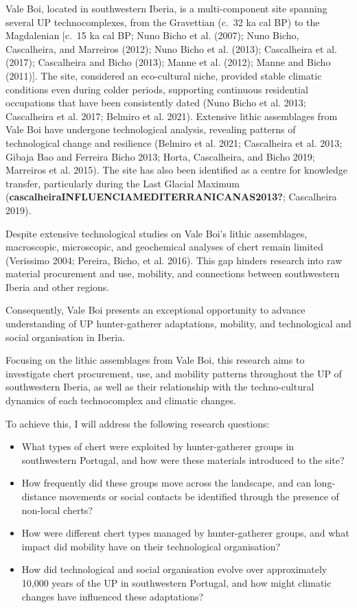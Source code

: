 \documentclass[
  a4paper,
  DIV=11,
  numbers=noendperiod]{scrreprt}
\begin{document}
Vale Boi, located in southwestern Iberia, is a multi-component site
spanning several UP technocomplexes, from the Gravettian (c.~32 ka cal
BP) to the Magdalenian {[}c.~15 ka cal BP; Nuno Bicho et al. (2007);
Nuno Bicho, Cascalheira, and Marreiros (2012); Nuno Bicho et al. (2013);
Cascalheira et al. (2017); Cascalheira and Bicho (2013); Manne et al.
(2012); Manne and Bicho (2011){]}. The site, considered an eco-cultural
niche, provided stable climatic conditions even during colder periods,
supporting continuous residential occupations that have been
consistently dated (Nuno Bicho et al. 2013; Cascalheira et al. 2017;
Belmiro et al. 2021). Extensive lithic assemblages from Vale Boi have
undergone technological analysis, revealing patterns of technological
change and resilience (Belmiro et al. 2021; Cascalheira et al. 2013;
Gibaja Bao and Ferreira Bicho 2013; Horta, Cascalheira, and Bicho 2019;
Marreiros et al. 2015). The site has also been identified as a centre
for knowledge transfer, particularly during the Last Glacial Maximum
(\textbf{cascalheiraINFLUENCIAMEDITERRANICANAS2013?}; Cascalheira 2019).

Despite extensive technological studies on Vale Boi's lithic
assemblages, macroscopic, microscopic, and geochemical analyses of chert
remain limited (Verissimo 2004; Pereira, Bicho, et al. 2016). This gap
hinders research into raw material procurement and use, mobility, and
connections between southwestern Iberia and other regions.

Consequently, Vale Boi presents an exceptional opportunity to advance
understanding of UP hunter-gatherer adaptations, mobility, and
technological and social organisation in Iberia.

Focusing on the lithic assemblages from Vale Boi, this research aims to
investigate chert procurement, use, and mobility patterns throughout the
UP of southwestern Iberia, as well as their relationship with the
techno-cultural dynamics of each technocomplex and climatic changes.

To achieve this, I will address the following research questions:

\begin{itemize}
\item
  What types of chert were exploited by hunter-gatherer groups in
  southwestern Portugal, and how were these materials introduced to the
  site?
\item
  How frequently did these groups move across the landscape, and can
  long-distance movements or social contacts be identified through the
  presence of non-local cherts?
\item
  How were different chert types managed by hunter-gatherer groups, and
  what impact did mobility have on their technological organisation?
\item
  How did technological and social organisation evolve over
  approximately 10,000 years of the UP in southwestern Portugal, and how
  might climatic changes have influenced these adaptations?
\end{itemize}
\end{document}
